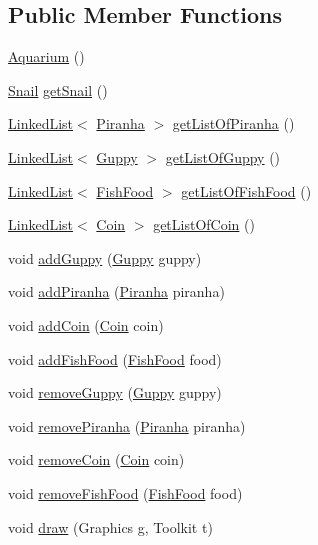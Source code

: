 \subsection*{Public Member Functions}
\begin{DoxyCompactItemize}
\item 
\mbox{\hyperlink{class_aquarium_a173f8b85de9d2f61c02d13ebdc05026c}{Aquarium}} ()
\item 
\mbox{\hyperlink{class_snail}{Snail}} \mbox{\hyperlink{class_aquarium_ac00cb1b361c2b368370f3fd1225ff296}{get\+Snail}} ()
\item 
\mbox{\hyperlink{class_linked_list}{Linked\+List}}$<$ \mbox{\hyperlink{class_piranha}{Piranha}} $>$ \mbox{\hyperlink{class_aquarium_a2427d901ce170774e36ca1a8ecbe8f4b}{get\+List\+Of\+Piranha}} ()
\item 
\mbox{\hyperlink{class_linked_list}{Linked\+List}}$<$ \mbox{\hyperlink{class_guppy}{Guppy}} $>$ \mbox{\hyperlink{class_aquarium_a411ebb8e3ada997747567f59da24a020}{get\+List\+Of\+Guppy}} ()
\item 
\mbox{\hyperlink{class_linked_list}{Linked\+List}}$<$ \mbox{\hyperlink{class_fish_food}{Fish\+Food}} $>$ \mbox{\hyperlink{class_aquarium_acfab5e8dd55512337ae91cf923e565e6}{get\+List\+Of\+Fish\+Food}} ()
\item 
\mbox{\hyperlink{class_linked_list}{Linked\+List}}$<$ \mbox{\hyperlink{class_coin}{Coin}} $>$ \mbox{\hyperlink{class_aquarium_a9b0dec4c194324e6095b81262b042460}{get\+List\+Of\+Coin}} ()
\item 
void \mbox{\hyperlink{class_aquarium_a4deb3514c2e387b5d3e33424c18144c1}{add\+Guppy}} (\mbox{\hyperlink{class_guppy}{Guppy}} guppy)
\item 
void \mbox{\hyperlink{class_aquarium_a30faca886e988aa80f512086cd817588}{add\+Piranha}} (\mbox{\hyperlink{class_piranha}{Piranha}} piranha)
\item 
void \mbox{\hyperlink{class_aquarium_a8b33e39d738b36ef732fefbcfdbd9ab1}{add\+Coin}} (\mbox{\hyperlink{class_coin}{Coin}} coin)
\item 
void \mbox{\hyperlink{class_aquarium_a36020897197a43587bcedc6aaf617a0f}{add\+Fish\+Food}} (\mbox{\hyperlink{class_fish_food}{Fish\+Food}} food)
\item 
void \mbox{\hyperlink{class_aquarium_a08f7e597644cad58198ed84d431f4599}{remove\+Guppy}} (\mbox{\hyperlink{class_guppy}{Guppy}} guppy)
\item 
void \mbox{\hyperlink{class_aquarium_ae0e31a6266a7d847f2bcaf1ee77fe5b4}{remove\+Piranha}} (\mbox{\hyperlink{class_piranha}{Piranha}} piranha)
\item 
void \mbox{\hyperlink{class_aquarium_af6f2d1079224c08a0ff7d376ea04c732}{remove\+Coin}} (\mbox{\hyperlink{class_coin}{Coin}} coin)
\item 
void \mbox{\hyperlink{class_aquarium_a6c1a0d6a0cc7cd4604dfce22706f57ca}{remove\+Fish\+Food}} (\mbox{\hyperlink{class_fish_food}{Fish\+Food}} food)
\item 
void \mbox{\hyperlink{class_aquarium_af6a186c92c1f91f92ae382416b77d3c3}{draw}} (Graphics g, Toolkit t)
\end{DoxyCompactItemize}
